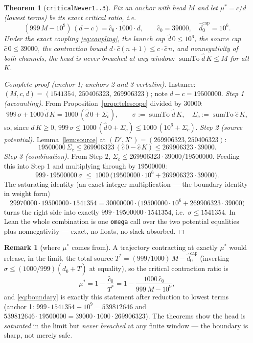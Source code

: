 \documentclass[11pt]{article}
\newcommand{\dhat}{\widehat{d}}
\newcommand{\chat}{\widehat{c}}
\newcommand{\sumto}{\operatorname{sumTo}}
\theoremstyle{plain}
\newtheorem{theorem}[lemma]{Theorem}
\theoremstyle{definition}
\newtheorem{remark}[lemma]{Remark}
\begin{document}
\begin{theorem}[\texttt{criticalNever1..3}]\label{thm:critical}
Fix an anchor with head $M$ and let $\mu^\ast=c/d$ (lowest terms) be its exact critical
ratio, i.e.
\begin{equation}\label{eq:boundary}
(999\,M-10^{9})\,(d-c)=\chat_0\cdot 1000\cdot d,
\qquad \chat_0=39000,\quad \dhat_0^{\mathrm{cap}}=10^{6}.
\end{equation}
Under the exact coupling \eqref{eq:coupling}, the launch cap $\dhat\,0\le 10^{6}$, the
source cap $\chat\,0\le 39000$, the contraction bound
$d\cdot\chat(n+1)\le c\cdot\chat\,n$, and nonnegativity of both channels, the head is
never breached at any window: $\sumto\dhat\,K\le M$ for \emph{all} $K$.
\end{theorem}
\begin{proof}[Complete proof (anchor 1; anchors 2 and 3 verbatim)]
Instance: $(M,c,d)=(1541354,\,250406323,\,269906323)$; note $d-c=19500000$.
\emph{Step 1 (accounting).} From Proposition~\ref{prop:telescope} divided by $30000$:
\[
999\,\sigma+1000\,\dhat\,K=1000\,(\dhat\,0+\Sigma_c),\qquad
\sigma:=\sumto\dhat\,K,\quad\Sigma_c:=\sumto\chat\,K,
\]
so, since $\dhat\,K\ge 0$,
$999\,\sigma\le 1000\,(\dhat\,0+\Sigma_c)\le 1000\,(10^{6}+\Sigma_c)$.
\emph{Step 2 (source potential).} Lemma~\ref{lem:source} at $(D',X')=(269906323,250406323)$:
\[
19500000\,\Sigma_c\le 269906323\,(\chat\,0-\chat\,K)\le 269906323\cdot 39000 .
\]
\emph{Step 3 (combination).} From Step 2, $\Sigma_c\le 269906323\cdot 39000/19500000$.
Feeding this into Step 1 and multiplying through by $19500000$:
\[
999\cdot 19500000\,\sigma
\;\le\;1000\,\bigl(19500000\cdot 10^{6}+269906323\cdot 39000\bigr).
\]
The saturating identity (an exact integer multiplication --- the boundary identity in
weight form)
\[
29970000\cdot 19500000\cdot 1541354
=30000000\cdot\bigl(19500000\cdot 10^{6}+269906323\cdot 39000\bigr)
\]
turns the right side into exactly $999\cdot 19500000\cdot 1541354$, i.e.\
$\sigma\le 1541354$. In Lean the whole combination is one \texttt{omega} call over the two
potential equalities plus nonnegativity --- exact, no floats, no slack absorbed.
\end{proof}

\begin{remark}[where $\mu^\ast$ comes from]\label{rem:mustar}
A trajectory contracting at exactly $\mu^\ast$ would release, in the limit, the total
source $T^{\ast}=(999/1000)\,M-\dhat_0^{\mathrm{cap}}$ (inverting
$\sigma\le(1000/999)(\dhat_0+T)$ at equality), so the critical contraction ratio is
\[
\mu^{\ast}=1-\frac{\chat_0}{T^{\ast}}=1-\frac{1000\,\chat_0}{999\,M-10^{9}},
\]
and \eqref{eq:boundary} is exactly this statement after reduction to lowest terms
(anchor 1: $999\cdot 1541354-10^{9}=539812646$ and
$539812646\cdot 19500000=39000\cdot 1000\cdot 269906323$). The theorems show the head is
\emph{saturated} in the limit but \emph{never breached} at any finite window --- the
boundary is sharp, not merely safe.
\end{remark}
\end{document}
